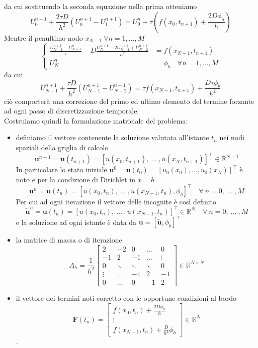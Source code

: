 \documentclass[11pt]{article}
\newcommand{\R}{\mathbb{R}}
\begin{document}
da cui sostituendo la seconda equazione nella prima otteniamo
\[
U_0^{n+1} + \frac{2\tau D}{h^2}(U_0^{n+1}-U_1^{n+1})= U_0^n +  \tau(f(x_0,t_{n+1})+ \frac{2D\phi_a}{h})
\]
Mentre il penultimo nodo \(x_{N-1} \ \forall n=1,\dots,M\) 
\[
\left\{
\begin{aligned}
\frac{U_{N-1}^{n+1}-U_{N-1}^n}{\tau} - D \frac{U_{N}^{n+1}-2U_{N-1}^{n+1}+U_{N-2}^{n+1}}{h^2} &= f(x_{N-1},t_{n+1}) \\
U_N^n &= \phi_b \quad \forall n=1,\dots,M
\end{aligned}
\right.
\]
da cui 
\[
U_{N-1}^{n+1} + \frac{\tau D}{h^2}( U_{N-1}^{n+1} - U_{N-2}^{n+1}) = \tau f(x_{N-1},t_{n+1}) +\frac{D \tau \phi_b}{h^2}
\]
ciò comporterà una correzione del primo ed ultimo elemento del termine forzante ad ogni passo di discretizzazione temporale.\\
Costruiamo quindi la formulazione matriciale del problema: 
\begin{itemize}
\item definiamo il vettore contenente la soluzione valutata all'istante \(t_n\) nei nodi spaziali della griglia di calcolo \[ \mathbf{u}^{n+1} =\mathbf{u}(t_{n+1})=[u(x_0,t_{n+1}), \ \dots \ , u(x_N,t_{n+1})]^\top  \in \R^{N+1}\]
In particolare  lo stato iniziale \( \mathbf{u}^0=\mathbf{u}(t_0)=[u_0(x_0), \dots, u_0(x_N)]^\top \) è noto e  per la condizione di Dirichlet in \(x=b\) \[ \mathbf{u}^{n} =\mathbf{u}(t_{n})=[u(x_0,t_{n}), \ \dots \ , u(x_{N-1},t_n), \phi_b ]^\top \quad \forall \ n=0, \ \dots \ ,M \]  
Per cui ad ogni iterazione il vettore delle incognite è così definito
\[
\mathbf{\tilde{u}}^{n} =\mathbf{u}(t_{n})=[u(x_0,t_{n}), \ \dots \ , u(x_{N-1},t_n)]^\top \in \R^N \quad \forall \ n=0, \ \dots \ ,M
\]
e la soluzione ad ogni istante è data da \( \mathbf{u}= [ \mathbf{\tilde{u}}, \phi_b]^\top \) 
\item la matrice di massa o di iterazione 
\[
A_h= \frac{1}{h^2} \begin{bmatrix}
2 & -2 & 0 & \dots & 0 \\
-1 & 2 & -1 & \dots & \vdots\\
0 & \ddots & \ddots & \ddots & 0 \\
\vdots& \dots & -1& 2& -1 \\
0 & \dots & 0& -1 & 2
\end{bmatrix} \in \R^{N \times N} 
\]
\item il vettore dei termini noti corretto con le opportune condizioni al bordo
\[
\mathbf{F}(t_n)=\begin{bmatrix}
f(x_0,t_n)+ \frac{2D\phi_a}{h}\\
\vdots \\
f(x_{N-1},t_n) +\frac{D}{h^2}\phi_b
\end{bmatrix} \in \R^N
\].
\end{itemize}
\end{document}
